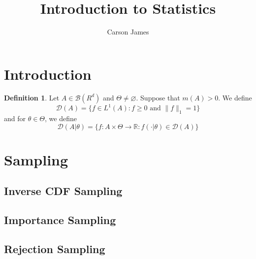 \documentclass[12pt]{amsart}
\theoremstyle{definition}
\newtheorem{defn}[definition]{Definition}
\newcommand{\R}{\mathbb{R}}
\newcommand{\MB}{\mathcal{B}}
\newcommand{\MD}{\mathcal{D}}
\begin{document}
	
	\title{Introduction to Statistics}
	\author{Carson James}
	\maketitle
	
	\tableofcontents
	
	\section{Introduction}
	\begin{defn}
		Let $A \in \MB(R^d)$ and $\Theta \neq \varnothing$. Suppose that $m(A) > 0$. We define 
		$$\MD(A) = \{f \in L^1(A) : f \geq 0 \text{ and } \|f\|_1 = 1\}$$ 
		and for $\theta \in \Theta$, we define
		$$\MD(A|\theta) = \{f: A \times \Theta \rightarrow \R : f(\cdot| \theta) \in \MD(A)\}$$
	\end{defn}
	
	
	
	
	
	
	\newpage
	\section{Sampling}
	
	\subsection{Inverse CDF Sampling}
	
	
	













	\newpage
	
	\subsection{Importance Sampling}
	
	
	
	
	
	
	
	
	
	
	
	
	
	
	
	
	
	
	
	
	
	\newpage
	\subsection{Rejection Sampling}
	
\end{document}
